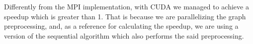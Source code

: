 Differently from the MPI implementation, with CUDA we managed to achieve a speedup which is greater than 1. That is because we are parallelizing the graph preprocessing, and, as a reference for calculating the speedup, we are using a version of the sequential algorithm which also performs the said preprocessing.